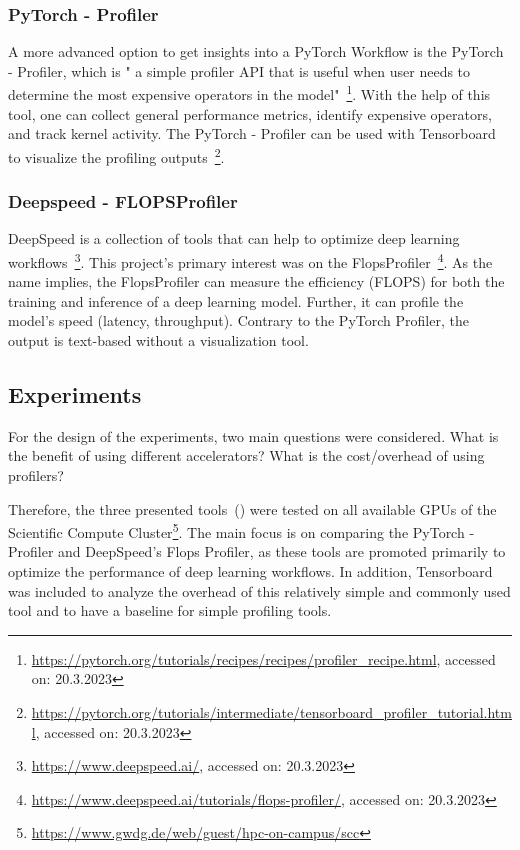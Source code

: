 \documentclass[12pt, a4paper, hidelinks]{article}
\begin{document}
\subsubsection{PyTorch - Profiler}
\label{sec:m-pytorch-profiler}

A more advanced option to get insights into a PyTorch Workflow is the PyTorch - Profiler, which is " a simple profiler API that is useful when user needs to determine the most expensive operators in the model"~\footnote{\url{https://pytorch.org/tutorials/recipes/recipes/profiler_recipe.html}, accessed on: 20.3.2023}.
With the help of this tool, one can collect general performance metrics, identify expensive operators, and track kernel activity.
The PyTorch - Profiler can be used with Tensorboard to visualize the profiling outputs~\footnote{\url{https://pytorch.org/tutorials/intermediate/tensorboard_profiler_tutorial.html}, accessed on: 20.3.2023}.


\subsubsection{Deepspeed - FLOPSProfiler}
\label{sec:m-FLOPSprofiler}

DeepSpeed is a collection of tools that can help to optimize deep learning workflows~\footnote{\url{https://www.deepspeed.ai/}, accessed on: 20.3.2023}.
This project's primary interest was on the FlopsProfiler~\footnote{\url{https://www.deepspeed.ai/tutorials/flops-profiler/}, accessed on: 20.3.2023}. 
As the name implies, the FlopsProfiler can measure the efficiency (\ac{FLOPS}) for both the training and inference of a deep learning model. Further, it can profile the model's speed (latency, throughput).
Contrary to the PyTorch Profiler, the output is text-based without a visualization tool.


\subsection{Experiments}
\label{sec:m-experiments}

For the design of the experiments, two main questions were considered.
What is the benefit of using different accelerators? What is the cost/overhead of using profilers?

Therefore, the three presented tools~() were tested on all available \ac{GPU}s of the Scientific Compute Cluster\footnote{\tiny{\url{https://www.gwdg.de/web/guest/hpc-on-campus/scc}}}.
The main focus is on comparing the PyTorch - Profiler and DeepSpeed's Flops Profiler, as these tools are promoted primarily to optimize the performance of deep learning workflows. In addition, Tensorboard was included to analyze the overhead of this relatively simple and commonly used tool and to have a baseline for simple profiling tools.
\end{document}
